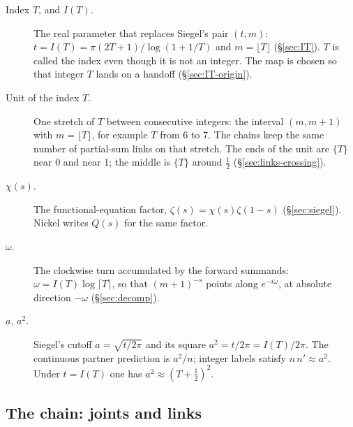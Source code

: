 \documentclass[11pt]{article}
\theoremstyle{definition}
\begin{document}
\begin{description}
\item[Index $T$, and $I(T)$.]
The real parameter that replaces Siegel's pair $(t,m)$:
$t=I(T)=\pi(2T+1)/\log(1+1/T)$ and $m=\lfloor T\rfloor$
(\S\ref{sec:IT}).
$T$ is called the index even though it is not an integer.
The map is chosen so that integer $T$ lands on a handoff
(\S\ref{sec:IT-origin}).

\item[Unit of the index $T$.]
One stretch of $T$ between consecutive integers: the interval
$(m,m+1)$ with $m=\lfloor T\rfloor$, for example $T$ from $6$ to $7$.
The chains keep the same number of partial-sum links on that stretch.
The ends of the unit are $\{T\}$ near $0$ and near $1$; the middle is
$\{T\}$ around $\tfrac12$
(\S\ref{sec:links-crossing}).

\item[$\chi(s)$.]
The functional-equation factor,
$\zeta(s)=\chi(s)\zeta(1-s)$
(\S\ref{sec:siegel}).
Nickel writes $Q(s)$ for the same factor.

\item[$\omega$.]
The clockwise turn accumulated by the forward summands:
$\omega=I(T)\log\lceil T\rceil$, so that $(m+1)^{-s}$ points along
$e^{-i\omega}$, at absolute direction $-\omega$
(\S\ref{sec:decomp}).

\item[$a$, $a^{2}$.]
Siegel's cutoff $a=\sqrt{t/2\pi}$ and its square
$a^{2}=t/2\pi=I(T)/2\pi$.
The continuous partner prediction is $a^{2}/n$; integer labels
satisfy $n\,n'\approx a^{2}$.
Under $t=I(T)$ one has $a^{2}\approx(T+\tfrac12)^{2}$.
\end{description}

\subsection*{The chain: joints and links}
\end{document}
